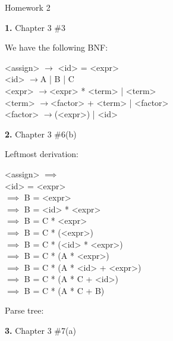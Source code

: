 \documentclass[letterpaper, 11pt]{article}
\newcommand{\hwnumbersec}[2]{\medskip \noindent\textbf{#1.} Chapter 3 \##2 \smallskip}
\newcommand{\To}{$\rightarrow$}
\begin{document}
\begin{center}
	{\LARGE Homework 2}\\
\end{center}

\hwnumbersec{1}{3}

We have the following BNF:
\medskip

\begin{minipage}{0.8\textwidth}
\centering
\begin{grammar}
	<assign> $\rightarrow$ <id> = <expr> \\
	<id> \To A | B | C \\
	<expr> \To <expr> * <term> | <term> \\
	<term> \To <factor> + <term> | <factor> \\ 
	<factor> \To (<expr>) | <id>
\end{grammar}
\end{minipage}

\hwnumbersec{2}{6(b)}

Leftmost derivation:
\medskip

\begin{minipage}{0.8\textwidth}
\centering
\begin{grammar}
	<assign> $\implies$\\
	<id> = <expr> \\
	$\implies$ B = <expr> \\
	$\implies$ B = <id> * <expr> \\
	$\implies$ B = C * <expr> \\
	$\implies$ B = C * (<expr>)\\
	$\implies$ B = C * (<id> * <expr>) \\
	$\implies$ B = C * (A * <expr>)\\
	$\implies$ B = C * (A * <id> + <expr>)\\
	$\implies$ B = C * (A * C + <id>)\\
	$\implies$ B = C * (A * C + B)
\end{grammar}
\end{minipage}

Parse tree:


\hwnumbersec{3}{7(a)}
\end{document}
